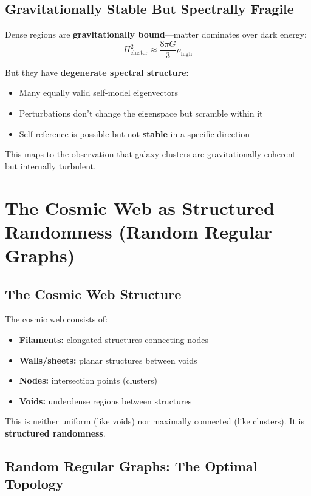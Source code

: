 \documentclass[11pt,a4paper]{article}
\theoremstyle{plain}
\theoremstyle{definition}
\theoremstyle{remark}
\begin{document}
\subsection{Gravitationally Stable But Spectrally Fragile}

Dense regions are \textbf{gravitationally bound}---matter dominates over dark energy:
\[
H_{\text{cluster}}^2 \approx \frac{8\pi G}{3}\rho_{\text{high}}
\]

But they have \textbf{degenerate spectral structure}:
\begin{itemize}[noitemsep]
    \item Many equally valid self-model eigenvectors
    \item Perturbations don't change the eigenspace but scramble within it
    \item Self-reference is possible but not \textbf{stable} in a specific direction
\end{itemize}

This maps to the observation that galaxy clusters are gravitationally coherent but internally turbulent.

\section{The Cosmic Web as Structured Randomness (Random Regular Graphs)}

\subsection{The Cosmic Web Structure}

The cosmic web consists of:
\begin{itemize}[noitemsep]
    \item \textbf{Filaments:} elongated structures connecting nodes
    \item \textbf{Walls/sheets:} planar structures between voids
    \item \textbf{Nodes:} intersection points (clusters)
    \item \textbf{Voids:} underdense regions between structures
\end{itemize}

This is neither uniform (like voids) nor maximally connected (like clusters). It is \textbf{structured randomness}.

\subsection{Random Regular Graphs: The Optimal Topology}
\end{document}

